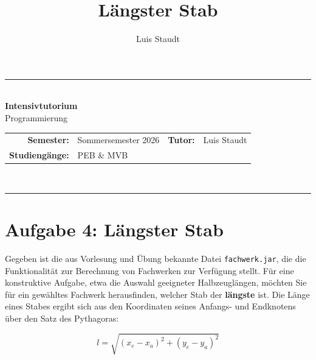 \documentclass[
	fontsize=12pt,          %
	paper=a4,               %
	numbers=noenddot,       %
	listof=totoc,           %
	listof=entryprefix,     %
	listof=nochaptergap,    %
	bibliography=totoc,     %
	parskip=half            %
	openany                 %
]{scrbook}
\title{\Huge\textbf{Längster Stab}}
\author{Luis Staudt}
\date{}
\begin{document}
\begin{center}
	\rule{\textwidth}{0.8pt}\\[0.6em]
	{\LARGE\bfseries Intensivtutorium}\\[0.3em]
	{\large Programmierung}\\[0.6em]
	\begin{tabular}{r l @{\hspace{2cm}} r l}
		\textbf{Semester:}      & Sommersemester 2026                    & \textbf{Tutor:}         & Luis Staudt \\
		\textbf{Studiengänge:}  & PEB \& MVB         & & \\
	\end{tabular}\\[0.6em]
	\rule{\textwidth}{0.8pt}
\end{center}
\vspace{1em}

\pagestyle{fancy}
\fancyhf{}
\cfoot{\thepage}
\renewcommand{\headrulewidth}{0.4pt}



\section*{Aufgabe 4: Längster Stab}

Gegeben ist die aus Vorlesung und Übung bekannte Datei \texttt{fachwerk.jar}, die die Funktionalität zur Berechnung von Fachwerken zur Verfügung stellt.
Für eine konstruktive Aufgabe, etwa die Auswahl geeigneter Halbzeuglängen, möchten Sie für ein gewähltes Fachwerk herausfinden, welcher Stab der \textbf{längste} ist.
Die Länge eines Stabes ergibt sich aus den Koordinaten seines Anfangs- und Endknotens über den Satz des Pythagoras:

\[
	l = \sqrt{(x_e - x_a)^2 + (y_e - y_a)^2}
\]
\end{document}

